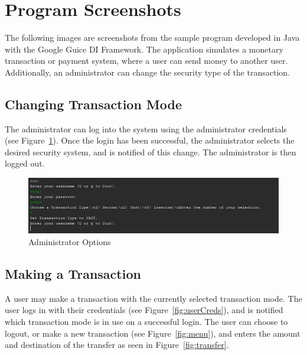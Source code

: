 \documentclass[12pt,twocolumn]{IEEEtran}
\begin{document}
\clearpage
\onecolumn
\appendices
\renewcommand\thefigure{\thesection.\arabic{figure}} 
\renewcommand\theequation{\thesection.\arabic{equation}} 
\renewcommand\thetable{\thesection.\arabic{table}}
\renewcommand\thelstlisting{\thesection.\arabic{lstlisting}}
\section{Program Screenshots} \label{app:screenshots}
\setcounter{figure}{0}  
\setcounter{equation}{0} 
\setcounter{table}{0}

The following images are screenshots from the sample program developed in Java with the Google Guice DI Framework. The application simulates a monetary transaction or payment system, where a user can send money to another user. Additionally, an administrator can change the security type of the transaction.

\subsection{Changing Transaction Mode}

The administrator can log into the system using the administrator credentials (see Figure~\ref{fig:admin}). Once the login has been successful, the administrator selects the desired security system, and is notified of this change. The administrator is then logged out.

\begin{figure}[h!]
	\centering
	\includegraphics[width=0.6\linewidth]{./Resources/cli-admin.jpg}
	\caption{Administrator Options} \label{fig:admin}
\end{figure}

\subsection{Making a Transaction}

A user may make a transaction with the currently selected transaction mode. The user logs in with their credentials (see Figure~\ref{fig:userCreds}), and is notified which transaction mode is in use on a successful login. The user can choose to logout, or make a new transaction (see Figure~\ref{fig:menu}), and enters the amount and destination of the transfer as seen in Figure~\ref{fig:transfer}.
\end{document}
